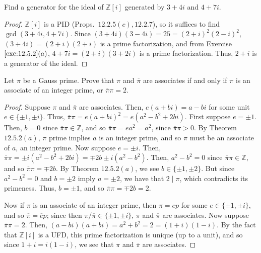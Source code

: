 \documentclass[12pt]{article}
\theoremstyle{remark}
\begin{document}
\begin{problem}
  Find a generator for the ideal of $\mathbb{Z}[i]$ generated by $3+4i$ and $4+7i$.
\end{problem}
\begin{proof}
  $\mathbb{Z}[i]$ is a PID (Props.~$12.2.5(c),12.2.7$), so it suffices to find $\gcd(3+4i,4+7i)$. Since $(3+4i)(3-4i) = 25 = (2+i)^2(2-i)^2$, $(3+4i) = (2+i)(2+i)$ is a prime factorization, and from Exercise $\ref{exc:12.5.2}(a)$, $4+7i = (2+i)(3+2i)$ is a prime factorization. Thus, $2+i$ is a generator of the ideal.
\end{proof}

\setcounter{subsubsection}{4}
\begin{problem}
  Let $\pi$ be a Gauss prime. Prove that $\pi$ and $\overline{\pi}$ are associates if and only if $\pi$ is an associate of an integer prime, or $\overline{\pi}\pi = 2$.
\end{problem}
\begin{proof}
  Suppose $\pi$ and $\overline{\pi}$ are associates. Then, $e(a+bi) = a-bi$ for some unit $e \in \{\pm1,\pm i\}$. Thus, $\overline{\pi}\pi = e(a+bi)^2 = e(a^2 - b^2 + 2bi)$. First suppose $e = \pm1$. Then, $b = 0$ since $\overline{\pi}\pi \in \mathbb{Z}$, and so $\overline{\pi}\pi = ea^2 = a^2$, since $\overline{\pi}\pi > 0$. By Theorem $12.5.2(a)$, $\pi$ prime implies $a$ is an integer prime, and so $\pi$ must be an associate of $a$, an integer prime. Now suppose $e = \pm i$. Then, $\overline{\pi}\pi = \pm i (a^2 - b^2 + 2bi) = \mp 2b \pm i (a^2 - b^2)$. Then, $a^2 - b^2 = 0$ since $\overline{\pi}\pi \in \mathbb{Z}$, and so $\overline{\pi}\pi = \mp 2b$. By Theorem $12.5.2(a)$, we see $b \in \{\pm1, \pm2\}$. But since $a^2 - b^2 = 0$ and $b = \pm 2$ imply $a = \pm 2$, we have that $2 \mid \pi$, which contradicts its primeness. Thus, $b = \pm 1$, and so $\overline{\pi}\pi = \mp 2b = 2$.
  \par Now if $\pi$ is an associate of an integer prime, then $\pi = ep$ for some $e \in \{\pm1 ,\pm i\}$, and so $\overline{\pi} = \overline{e}p$; since then $\pi/\overline{\pi} \in \{\pm1 ,\pm i\}$, $\pi$ and $\overline{\pi}$ are associates. Now suppose $\overline{\pi}\pi = 2$. Then, $(a-bi)(a+bi) = a^2 + b^2 = 2 = (1+i)(1-i)$. By the fact that $\mathbb{Z}[i]$ is a UFD, this prime factorization is unique (up to a unit), and so since $1+i = i(1-i)$, we see that $\pi$ and $\overline{\pi}$ are associates.
\end{proof}
\end{document}

